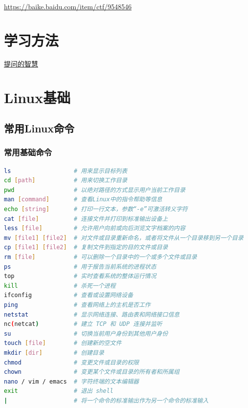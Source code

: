 \indent \href{https://baike.baidu.com/item/ctf/9548546}{https://baike.baidu.com/item/ctf/9548546}

\section{学习方法}
\indent \setlength{\parindent}{2em}
\indent \href{https://github.com/ryanhanwu/How-To-Ask-Questions-The-Smart-Way}{提问的智慧}

\section{Linux基础}
\setlength{\parindent}{2em}

\subsection{常用Linux命令}
\subsubsection{常用基础命令}
\begin{lstlisting}[language=bash, style=customStyleBashDark, caption=基础命令]
ls                  # 用来显示目标列表
cd [path]           # 用来切换工作目录
pwd                 # 以绝对路径的方式显示用户当前工作目录
man [command]       # 查看Linux中的指令帮助等信息
echo [string]       # 打印一行文本，参数“-e”可激活转义字符
cat [file]          # 连接文件并打印到标准输出设备上
less [file]         # 允许用户向前或向后浏览文字档案的内容
mv [file1] [file2]  # 对文件或目录重新命名，或者将文件从一个目录移到另一个目录
cp [file1] [file2]  # 复制文件到指定的目的文件或目录
rm [file]           # 可以删除一个目录中的一个或多个文件或目录
ps                  # 用于报告当前系统的进程状态
top                 # 实时查看系统的整体运行情况
kill                # 杀死一个进程
ifconfig            # 查看或设置网络设备
ping                # 查看网络上的主机是否工作
netstat             # 显示网络连接、路由表和网络接口信息
nc(netcat)          # 建立 TCP 和 UDP 连接并监听
su                  # 切换当前用户身份到其他用户身份
touch [file]        # 创建新的空文件
mkdir [dir]         # 创建目录
chmod               # 变更文件或目录的权限
chown               # 变更某个文件或目录的所有者和所属组
nano / vim / emacs  # 字符终端的文本编辑器
exit                # 退出 shell
|                   # 将一个命令的标准输出作为另一个命令的标准输入
\end{lstlisting}


